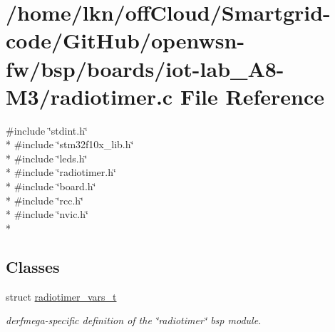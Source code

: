 \hypertarget{iot-lab___a8-_m3_2radiotimer_8c}{}\section{/home/lkn/off\+Cloud/\+Smartgrid-\/code/\+Git\+Hub/openwsn-\/fw/bsp/boards/iot-\/lab\+\_\+\+A8-\/\+M3/radiotimer.c File Reference}
\label{iot-lab___a8-_m3_2radiotimer_8c}
{\ttfamily \#include \char`\"{}stdint.\+h\char`\"{}}\\*
{\ttfamily \#include \char`\"{}stm32f10x\+\_\+lib.\+h\char`\"{}}\\*
{\ttfamily \#include \char`\"{}leds.\+h\char`\"{}}\\*
{\ttfamily \#include \char`\"{}radiotimer.\+h\char`\"{}}\\*
{\ttfamily \#include \char`\"{}board.\+h\char`\"{}}\\*
{\ttfamily \#include \char`\"{}rcc.\+h\char`\"{}}\\*
{\ttfamily \#include \char`\"{}nvic.\+h\char`\"{}}\\*
\subsection*{Classes}
\begin{DoxyCompactItemize}
\item 
struct \hyperlink{structradiotimer__vars__t}{radiotimer\+\_\+vars\+\_\+t}
\begin{DoxyCompactList}\small\item\em derfmega-\/specific definition of the \char`\"{}radiotimer\char`\"{} bsp module. \end{DoxyCompactList}\end{DoxyCompactItemize}
